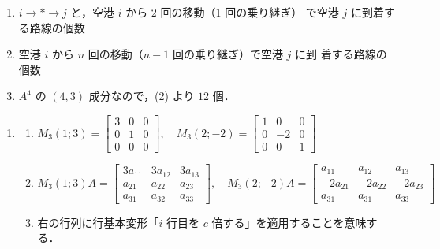 \documentclass[11pt, uplatex, dvipdfmx]{jsarticle}
\begin{document}
\begin{enumerate}
\begin{enumerate}[(1)]
  \item $i \to \ast \to j$ と，空港 $i$ から $2$ 回の移動（$1$ 回の乗り継ぎ）
    で空港 $j$ に到着する路線の個数

  \item 空港 $i$ から $n$ 回の移動（$n-1$ 回の乗り継ぎ）で空港 $j$ に到
    着する路線の個数

  \item $A^4$ の $(4,3)$ 成分なので，(2) より $12$ 個．
  \end{enumerate}
\end{enumerate}

\vspace{1zh}

\begin{enumerate}
  \setlength{\itemsep}{1ex}
  
\item
  \begin{enumerate}[(1)]
    \setlength{\itemsep}{1ex}
    
  \item $M_3(1;3)=\left[
      \begin{array}{ccc}
        3 & 0 & 0\\
        0 & 1 & 0\\
        0 & 0 & 0
      \end{array}
    \right], \quad M_3(2;-2)=\left[
      \begin{array}{rrr}
        1 & 0 & 0\\
        0 & -2 & 0\\
        0 & 0 & 1
      \end{array}
    \right]$

  \item $M_3(1;3)A=\left[
      \begin{array}{rrr}
        3a_{11} & 3 a_{12} & 3 a_{13}\\
        a_{21} & a_{22} & a_{23}\\
        a_{31} & a_{32} & a_{33}
      \end{array}
    \right], \quad M_3(2;-2)A=\left[
      \begin{array}{rrr}
        a_{11} & a_{12} & a_{13}\\
        -2a_{21} & -2a_{22} & -2a_{23}\\
        a_{31} & a_{31} & a_{33}
      \end{array}
    \right]$

  \item 右の行列に行基本変形「$i$ 行目を $c$ 倍する」を適用することを意味する．
  \end{enumerate}


\end{enumerate}
\end{document}
